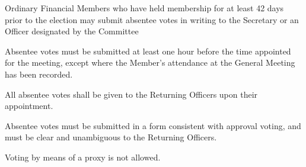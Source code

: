 \documentclass[a4paper]{article}
\begin{document}
\begin{myEnumerate}
\begin{myEnumerate}
            \item Ordinary Financial Members who have held membership for at least 42 days prior to the election may submit absentee votes in writing to the Secretary or an Officer designated by the Committee
            \begin{myEnumerate}
                \item Absentee votes must be submitted at least one hour before the time appointed for the meeting, except where the Member’s attendance at the General Meeting has been recorded.
                \item All absentee votes shall be given to the Returning Officers upon their appointment.
                \item Absentee votes must be submitted in a form consistent with approval voting, and must be clear and unambiguous to the Returning Officers.
            \end{myEnumerate}
            \item Voting by means of a proxy is not allowed.
        \end{myEnumerate}
\end{myEnumerate}
\end{document}
